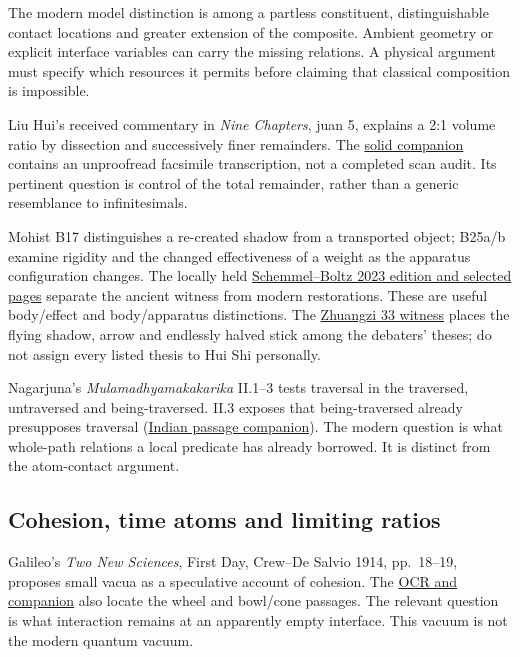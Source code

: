 \documentclass[11pt,a4paper]{article}
\begin{document}
The modern model distinction is among a partless constituent,
distinguishable contact locations and greater extension of the
composite. Ambient geometry or explicit interface variables can carry
the missing relations. A physical argument must specify which resources
it permits before claiming that classical composition is impossible.

Liu Hui's received commentary in \emph{Nine Chapters}, juan 5, explains
a 2:1 volume ratio by dissection and successively finer remainders. The
\href{../docs/batches/H10/chinese-solids-companion.md}{solid companion}
contains an unproofread facsimile transcription, not a completed scan
audit. Its pertinent question is control of the total remainder, rather
than a generic resemblance to infinitesimals.

Mohist B17 distinguishes a re-created shadow from a transported object;
B25a/b examine rigidity and the changed effectiveness of a weight as the
apparatus configuration changes. The locally held
\href{../docs/batches/H10/SchemmelBoltz_MohistCanon_2023.md}{Schemmel--Boltz
2023 edition and selected pages} separate the ancient witness from
modern restorations. These are useful body/effect and body/apparatus
distinctions. The
\href{../docs/classics/Zhuangzi_33_Tianxia_zh_wikisource.md}{Zhuangzi 33
witness} places the flying shadow, arrow and endlessly halved stick
among the debaters' theses; do not assign every listed thesis to Hui Shi
personally.

Nagarjuna's \emph{Mulamadhyamakakarika} II.1--3 tests traversal in the
traversed, untraversed and being-traversed. II.3 exposes that
being-traversed already presupposes traversal
(\href{../docs/batches/H10/indian-contact-motion-companion.md}{Indian
passage companion}). The modern question is what whole-path relations a
local predicate has already borrowed. It is distinct from the
atom-contact argument.

\hypertarget{cohesion-time-atoms-and-limiting-ratios}{%
\subsection{Cohesion, time atoms and limiting
ratios}\label{cohesion-time-atoms-and-limiting-ratios}}

Galileo's \emph{Two New Sciences}, First Day, Crew--De Salvio 1914,
pp.~18--19, proposes small vacua as a speculative account of cohesion.
The
\href{../docs/classics/Galileo_TwoNewSciences_FirstDay_CrewDeSalvio1914_OCR.md}{OCR
and companion} also locate the wheel and bowl/cone passages. The
relevant question is what interaction remains at an apparently empty
interface. This vacuum is not the modern quantum vacuum.
\end{document}
